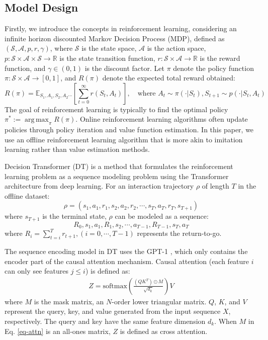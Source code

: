 \documentclass[runningheads]{llncs}
\newcounter{algorithm}
\DeclareMathOperator*{\argmax}{arg\,max}  %
\begin{document}
\subsection{Model Design}
Firstly, we introduce the concepts in reinforcement learning,
considering an infinite horizon discounted Markov Decision Process (MDP),
defined as $(\mathcal{S}, \mathcal{A}, p, r, \gamma)$, where $\mathcal{S}$ is the state space,
$\mathcal{A}$ is the action space,
$p: \mathcal{S} \times \mathcal{A} \times \mathcal{S} \to \mathbb{R}$ is the state transition function,
$r: \mathcal{S} \times \mathcal{A} \to \mathbb{R}$ is the reward function,
and $\gamma \in (0,1)$ is the discount factor.
Let $\pi$ denote the policy function $\pi: \mathcal{S} \times \mathcal{A} \to [0,1]$,
and $R(\pi)$ denote the expected total reward obtained:
\begin{equation}
  R(\pi) = \mathbb{E}_{S_1, A_1, S_2, A_2 \cdots}\left[\sum_{t=0}^{\infty} r(S_t, A_t)\right],\quad
  \text{where } A_t \sim \pi(\cdot|S_t), S_{t+1} \sim p(\cdot|S_t, A_t)
\end{equation}
The goal of reinforcement learning is typically to find the optimal policy $\pi^* := \argmax_{\pi} R(\pi)$.
Online reinforcement learning algorithms often update policies through policy iteration and value function estimation.
In this paper, we use an offline reinforcement learning algorithm that is more akin to imitation learning rather than value estimation methods.

Decision Transformer (DT) \cite{DT} is a method that formulates the reinforcement learning problem
as a sequence modeling problem using the Transformer \cite{transformer} architecture from deep learning.
For an interaction trajectory $\rho$ of length $T$ in the offline dataset:
\begin{equation}
  \rho = (s_1, a_1, r_1, s_2, a_2, r_2, \cdots, s_T, a_T, r_T, s_{T+1})
\end{equation}
where $s_{T+1}$ is the terminal state, $\rho$ can be modeled as a sequence:
\begin{equation}\label{eq-sequence}
  R_0, s_1, a_1, R_1, s_2, \cdots, a_{T-1}, R_{T-1}, s_T, a_T
\end{equation}
where $R_i = \sum_{t=i}^T r_{t+1}, (i=0, \cdots, T-1)$ represents the return-to-go.

\noindent The sequence encoding model in DT uses the GPT-1 \cite{GPT},
which only contains the encoder part of the causal attention mechanism.
Causal attention (each feature $i$ can only see features $j \leq i$) is defined as:
\begin{equation}\label{eq-attn}
\begin{aligned}
  Z = \text{softmax}\left(\frac{\left(QK^T\right) \odot M}{\sqrt{d_k}}\right)V
\end{aligned}
\end{equation}
where $M$ is the mask matrix, an $N$-order lower triangular matrix.
$Q$, $K$, and $V$ represent the query, key, and value generated from the input sequence $X$, respectively.
The query and key have the same feature dimension $d_k$.
When $M$ in Eq. \eqref{eq-attn} is an all-ones matrix, $Z$ is defined as cross attention.
\end{document}
